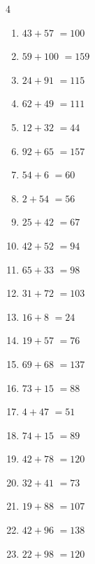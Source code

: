 \begin{multicols}{4}
\begin{enumerate}
  \item $43+57$
        $=100$

  \item $59+100$
        $=159$

\columnbreak %

  \item $24+91$
        $=115$

  \item $62+49$
        $=111$

  \item $12+32$
        $=44$

  \item $92+65$
        $=157$

  \item $54+6$
        $=60$

  \item $2+54$
        $=56$

  \item $25+42$
        $=67$

  \item $42+52$
        $=94$

  \item $65+33$
        $=98$

  \item $31+72$
        $=103$

  \item $16+8$
        $=24$

  \item $19+57$
        $=76$

  \item $69+68$
        $=137$

  \item $73+15$
        $=88$

  \item $4+47$
        $=51$

  \item $74+15$
        $=89$

  \item $42+78$
        $=120$

  \item $32+41$
        $=73$

  \item $19+88$
        $=107$

  \item $42+96$
        $=138$

  \item $22+98$
        $=120$


\end{enumerate}
\end{multicols}
